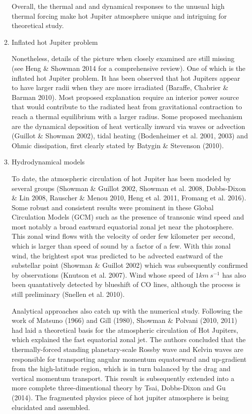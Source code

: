 \documentclass[11pt]{article}
\begin{document}
\begin{enumerate}
Overall, the thermal and and dynamical responses to the unusual high thermal forcing make hot Jupiter atmosphere unique and intriguing for theoretical study.

\item Inflated hot Jupiter problem

Nonetheless, details of the picture when closely examined are still missing  (see Heng \& Showman 2014 for a comprehensive review). One of which is the inflated hot Jupiter  problem. It has been observed that hot Jupiters appear to have larger radii when they are more irradiated (Baraffe, Chabrier \& Barman 2010). Most proposed explanation require an interior power source that would contribute to the radiated heat from gravitational contraction to reach a thermal equilibrium with a larger radius. 
Some proposed mechanism are the dynamical deposition of heat vertically inward via waves or advection (Guillot \& Showman 2002), tidal heating (Bodenheimer et al. 2001, 2003) and Ohmic dissipation, first clearly stated by Batygin \& Stevenson (2010).  

\item Hydrodynamical models

To date, the atmospheric circulation of hot Jupiter has been modeled by several groups (Showman \& Guillot 2002, Showman et al. 2008, Dobbs-Dixon \& Lin 2008, Rauscher \& Menou 2010, Heng et al. 2011, Fromang et al. 2016). Some robust and consistent results were  prominent in these Global Circulation Models (GCM) such as the presence of transonic wind speed and most notably a broad eastward equatorial zonal jet near the photosphere. This zonal wind flows with the velocity of order few kilometer per second, which is larger than speed of sound by a factor of a few. With this zonal wind, the brightest spot was predicted to be advected eastward of the substellar point (Showman \& Guillot 2002) which was subsequently confirmed by observations (Knutson et al. 2007).  Wind whose speed of $1km \ s^{-1}$ has also been quantatively detected by blueshift of CO lines, although the process is still preliminary (Snellen et al. 2010). 

Analytical approaches also catch up with the numerical study. Following the work of Matsuno (1966) and Gill (1980), Showman \& Polvani (2010, 2011) had laid a theoretical basis for the atmospheric circulation of Hot Jupiters, which explained the fast equatorial zonal jet. The authors concluded that the thermally-forced standing planetary-scale Rossby wave and Kelvin waves are responsible for transporting angular momentum equatorward and up-gradient from the high-latitude region, which is in turn balanced by the drag and vertical momentum transport. This result is subsequently extended into a more complete three-dimentional theory by Tsai, Dobbs-Dixon and Gu (2014). The fragmented physics piece of hot jupiter atmosphere is being elucidated and assembled.


\end{enumerate}
\end{document}
